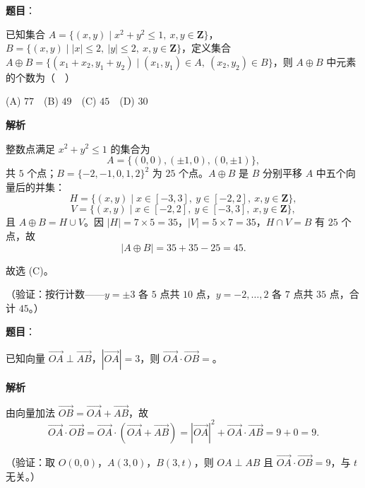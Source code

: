 \begin{answer}

\textbf{题目}：

已知集合 \(A=\{(x,y)\mid x^2+y^2\leqslant1,\ x,y\in\mathbf{Z}\}\)，\(B=\{(x,y)\mid |x|\leqslant2,\ |y|\leqslant2,\ x,y\in\mathbf{Z}\}\)，定义集合 \(A\oplus B=\{(x_1+x_2,y_1+y_2)\mid (x_1,y_1)\in A,\ (x_2,y_2)\in B\}\)，则 \(A\oplus B\) 中元素的个数为（　）

(A) \(77\)　(B) \(49\)　(C) \(45\)　(D) \(30\)

\textbf{解析}

整数点满足 \(x^2+y^2\leqslant1\) 的集合为
\nopagebreak[4]
\[
A=\{(0,0),(\pm1,0),(0,\pm1)\},
\]
共 \(5\) 个点；\(B=\{-2,-1,0,1,2\}^2\) 为 \(25\) 个点。\(A\oplus B\) 是 \(B\) 分别平移 \(A\) 中五个向量后的并集：
\nopagebreak[4]
\[
H=\{(x,y)\mid x\in[-3,3],\ y\in[-2,2],\ x,y\in\mathbf{Z}\},
\]
\nopagebreak[4]
\[
V=\{(x,y)\mid x\in[-2,2],\ y\in[-3,3],\ x,y\in\mathbf{Z}\},
\]
且 \(A\oplus B=H\cup V\)。因 \(|H|=7\times5=35\)，\(|V|=5\times7=35\)，\(H\cap V=B\) 有 \(25\) 个点，故
\nopagebreak[4]
\[
|A\oplus B|=35+35-25=45.
\]

故选 (C)。

（验证：按行计数——\(y=\pm3\) 各 \(5\) 点共 \(10\) 点，\(y=-2,\ldots,2\) 各 \(7\) 点共 \(35\) 点，合计 \(45\)。）


\end{answer}
\begin{answer}

\textbf{题目}：

已知向量 \(\overrightarrow{OA}\perp\overrightarrow{AB}\)，\(|\overrightarrow{OA}|=3\)，则 \(\overrightarrow{OA}\cdot\overrightarrow{OB}=\)\gkblank{}。

\textbf{解析}

由向量加法 \(\overrightarrow{OB}=\overrightarrow{OA}+\overrightarrow{AB}\)，故
\nopagebreak[4]
\[
\overrightarrow{OA}\cdot\overrightarrow{OB}
=\overrightarrow{OA}\cdot\left(\overrightarrow{OA}+\overrightarrow{AB}\right)
=|\overrightarrow{OA}|^2+\overrightarrow{OA}\cdot\overrightarrow{AB}
=9+0=9.
\]

（验证：取 \(O(0,0)\)，\(A(3,0)\)，\(B(3,t)\)，则 \(OA\perp AB\) 且 \(\overrightarrow{OA}\cdot\overrightarrow{OB}=9\)，与 \(t\) 无关。）


\end{answer}
